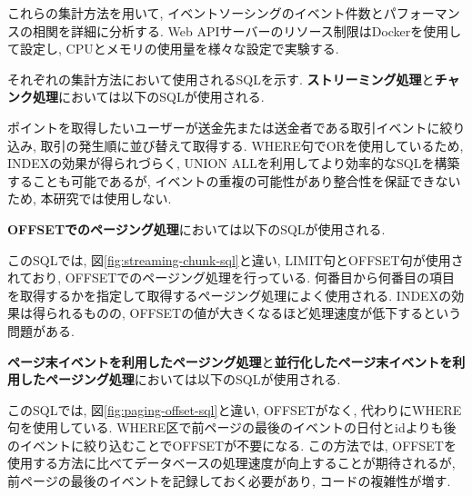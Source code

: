 \documentclass[../../../main]{subfiles}
\begin{document}
    これらの集計方法を用いて, イベントソーシングのイベント件数とパフォーマンスの相関を詳細に分析する. Web APIサーバーのリソース制限はDockerを使用して設定し, CPUとメモリの使用量を様々な設定で実験する.

    それぞれの集計方法において使用されるSQLを示す. \textbf{ストリーミング処理}と\textbf{チャンク処理}においては以下のSQLが使用される.

    

    ポイントを取得したいユーザーが送金先または送金者である取引イベントに絞り込み, 取引の発生順に並び替えて取得する. WHERE句でORを使用しているため, INDEXの効果が得られづらく, UNION ALLを利用してより効率的なSQLを構築することも可能であるが, イベントの重複の可能性があり整合性を保証できないため, 本研究では使用しない.

    \textbf{OFFSETでのページング処理}においては以下のSQLが使用される.

    

    このSQLでは, 図\ref{fig:streaming-chunk-sql}と違い, LIMIT句とOFFSET句が使用されており, OFFSETでのページング処理を行っている. 何番目から何番目の項目を取得するかを指定して取得するページング処理によく使用される. INDEXの効果は得られるものの, OFFSETの値が大きくなるほど処理速度が低下するという問題がある.

    \textbf{ページ末イベントを利用したページング処理}と\textbf{並行化したページ末イベントを利用したページング処理}においては以下のSQLが使用される.

    

    このSQLでは, 図\ref{fig:paging-offset-sql}と違い, OFFSETがなく, 代わりにWHERE句を使用している. WHERE区で前ページの最後のイベントの日付とidよりも後のイベントに絞り込むことでOFFSETが不要になる. この方法では, OFFSETを使用する方法に比べてデータベースの処理速度が向上することが期待されるが, 前ページの最後のイベントを記録しておく必要があり, コードの複雑性が増す.
\end{document}
